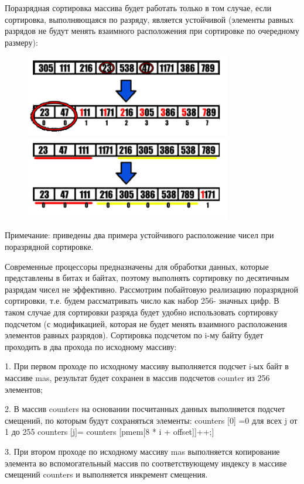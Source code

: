 \documentclass{report}
\begin{document}
Поразрядная сортировка массива будет работать только в том случае, если
сортировка, выполняющаяся по разряду, является устойчивой (элементы равных разрядов не будут менять взаимного расположения при сортировке по очередному размеру): 


\begin{figure}[htp]
    \includegraphics[width=9cm]{images/image6.png}
    \includegraphics[width=9cm]{images/image7.png}
    \label{fig:galaxy}
\end{figure}
Примечание: приведены два примера устойчивого расположение чисел при поразрядной сортировке.

\newpage

Современные процессоры предназначены для обработки данных, которые
представлены в битах и байтах, поэтому выполнять сортировку по десятичным
разрядам чисел не эффективно. Рассмотрим побайтовую реализацию
поразрядной сортировки, т.е. будем рассматривать число как набор 256-
значных цифр. В таком случае для сортировки разряда будет удобно
использовать сортировку подсчетом (с модификацией, которая не будет
менять взаимного расположения элементов равных разрядов).
Сортировка подсчетом по i-му байту будет проходить в два прохода по
исходному массиву:

1.	При первом проходе по исходному массиву выполняется подсчет
i-ых байт в массиве mas, результат будет сохранен в массив подсчетов
counter из 256 элементов;

2.	В массив counters на основании посчитанных данных выполняется
подсчет смещений, по которым будут сохраняться элементы:
counters [0] =0 для всех j от 1 до 255 counters [j]= counters [pmem[8 * i + offset]]++;]

3.	При втором проходе по исходному массиву mas выполняется
копирование элемента во вспомогательный массив по соответствующему индексу в массиве смещений counters и выполняется
инкремент смещения.
\end{document}

